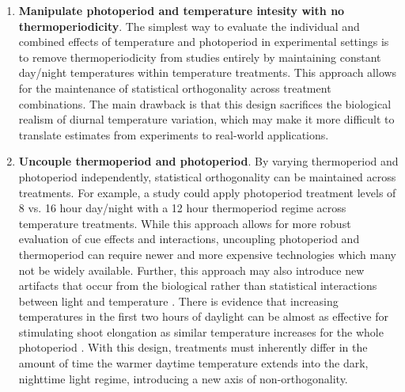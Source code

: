 \documentclass[11pt]{article}
\begin{document}
\begin{enumerate}
\item \textbf{Manipulate photoperiod and temperature intesity with no thermoperiodicity}. The simplest  way to evaluate the individual and combined effects of temperature and photoperiod in experimental settings is to remove thermoperiodicity from studies entirely by maintaining constant day/night temperatures within temperature treatments. This approach allows for the maintenance of statistical orthogonality across treatment combinations. The main drawback is that this design sacrifices the biological realism of diurnal temperature variation, which may make it more difficult to translate estimates from experiments to real-world applications.

\item \textbf{Uncouple thermoperiod and photoperiod}. By varying thermoperiod and photoperiod independently, statistical orthogonality can be maintained across treatments. For example, a study could apply photoperiod treatment levels of 8 vs. 16 hour day/night with a 12 hour thermoperiod regime across temperature treatments. While this approach allows for more robust evaluation of cue effects and interactions, uncoupling photoperiod and thermoperiod can require newer and more expensive technologies which many not be widely available. Further, this approach may also introduce new artifacts that occur from the biological rather than statistical interactions between light and temperature \citep{Chew:2012wj}. There is evidence that increasing temperatures in the first two hours of daylight can be almost as effective for stimulating shoot elongation as similar temperature increases for the whole photoperiod \citep{Erwin1998}. With this design, treatments must inherently differ in the amount of time the warmer daytime temperature extends into the dark, nighttime light regime, introducing a new axis of non-orthogonality. %


\end{enumerate}
\end{document}
